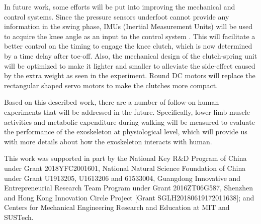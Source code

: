 \documentclass[10pt]{asme2ej}
\begin{document}
In future work, some efforts will be put into improving the mechanical and control systems.
Since the pressure sensors underfoot cannot provide any information in the swing phase, IMUs (Inertial Measurement Units) will be used to acquire the knee angle as an input to the control system \cite{IMU2,hao2019smoother}.
This will facilitate a better control on the timing to engage the knee clutch, which is now determined by a time delay after toe-off.
Also, the mechanical design of the clutch-spring unit will be optimized to make it lighter and smaller to alleviate the side-effect caused by the extra weight as seen in the experiment.
Round DC motors will replace the rectangular shaped servo motors to make the clutches more compact. 

Based on this described work, there are a number of follow-on human experiments that will be addressed in the future.
Specifically, lower limb muscle activities and metabolic expenditure during walking will be measured to evaluate the performance of the exoskeleton at physiological level, which will provide us with more details about how the exoskeleton interacts with human.

\begin{acknowledgment}
This work was supported in part by the National Key R\&D Program of China under Grant 2018YFC2001601, National Natural Science Foundation of China under Grant U1913205, U1613206 and 61533004, Guangdong Innovative and Entrepreneurial Research Team Program under Grant 2016ZT06G587, Shenzhen and Hong Kong Innovation Circle Project [Grant SGLH20180619172011638]; and Centers for Mechanical Engineering Research and Education at MIT and SUSTech.
\end{acknowledgment}

%



%


\clearpage
\listoffigures
\clearpage
\listoftables
\end{document}
